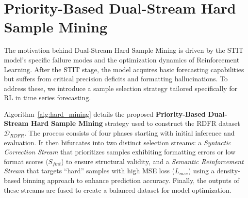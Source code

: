 

\section{ Priority-Based Dual-Stream Hard Sample Mining}\label{appx:sample-mining}

The motivation behind Dual-Stream Hard Sample Mining is driven by the STIT model's specific failure modes and the optimization dynamics of Reinforcement Learning. After the STIT stage, the model acquires basic forecasting capabilities but suffers from critical precision deficits and formatting hallucinations. To address these, we introduce a sample selection strategy tailored specifically for RL in time series forecasting.

Algorithm~\ref{alg:hard_mining} details the proposed \textbf{Priority-Based Dual-Stream Hard Sample Mining} strategy used to construct the RDFR dataset $\mathcal{D}_{RDFR}$. The process consists of four phases starting with initial inference and evaluation. It then bifurcates into two distinct selection streams: a \textit{Syntactic Correction Stream} that prioritizes samples exhibiting formatting errors or low format scores ($S_{fmt}$) to ensure structural validity, and a \textit{Semantic Reinforcement Stream} that targets ``hard'' samples with high MSE loss ($L_{mse}$) using a density-based binning approach to enhance prediction accuracy. Finally, the outputs of these streams are fused to create a balanced dataset for model optimization.

